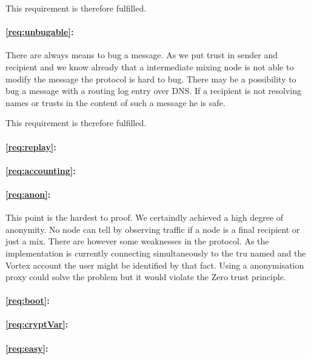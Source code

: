 This requirement is therefore fulfilled.
 
\paragraph{\ref{req:unbugable}:} 
There are always means to bug a message. As we put trust in sender and recipient and we know already that a intermediate mixing node is not able to modify the message the protocol is hard to bug. There may be a possibility to bug a message with a routing log entry over DNS. If a recipient is not resolving names or trusts in the content of such a message he is safe.

This requirement is therefore fulfilled.
\paragraph{\ref{req:replay}:} 

\paragraph{\ref{req:accounting}:} 

\paragraph{\ref{req:anon}:} This point is the hardest to proof. We certaindly achieved a high degree of anonymity. No node can tell by observing traffic if a node is a final recipient or just a mix. There are however some weaknesses in the protocol. As the implementation is currently connecting simultaneously to the tru named and the Vortex account the user might be identified by that fact. Using a anonymisation proxy could solve the problem but it would violate the Zero trust principle.

\paragraph{\ref{req:boot}:} 

\paragraph{\ref{req:cryptVar}:} 


\paragraph{\ref{req:easy}:}

